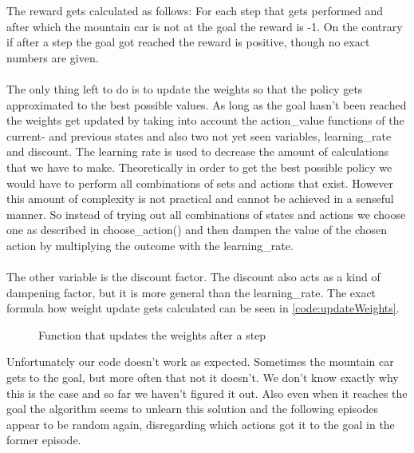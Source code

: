 \documentclass{article}
\begin{document}
	The reward gets calculated as follows: For each step that gets performed and after which the mountain car is not at the goal the reward is -1. On the contrary if after a step the goal got reached the reward is positive, though no exact numbers are given. \\
	\\
	The only thing left to do is to update the weights so that the policy gets approximated to the best possible values. As long as the goal hasn't been reached the weights get updated by taking into account the action\_value functions of the current- and previous states and also two not yet seen variables, learning\_rate and discount. The learning rate is used to decrease the amount of calculations that we have to make. Theoretically in order to get the best possible policy we would have to perform all combinations of sets and actions that exist. However this amount of complexity is not practical and cannot be achieved in a senseful manner. So instead of trying out all combinations of states and actions we choose one as described in choose\_action() and then dampen the value of the chosen action by multiplying the outcome with the learning\_rate. \\
	\\
	The other variable is the discount factor. The discount also acts as a kind of dampening factor, but it is more general than the learning\_rate. The exact formula how weight update gets calculated can be seen in \autoref{code:updateWeights}. 
	
	\begin{figure}[h]
		\caption{Function that updates the weights after a step}
		\label{code:updateWeights}
		
	\end{figure}
	
	Unfortunately our code doesn't work as expected. Sometimes the mountain car gets to the goal, but more often that not it doesn't. We don't know exactly why this is the case and so far we haven't figured it out. Also even when it reaches the goal the algorithm seems to unlearn this solution and the following episodes appear to be random again, disregarding which actions got it to the goal in the former episode. 
	
	
	
	
\end{document}
